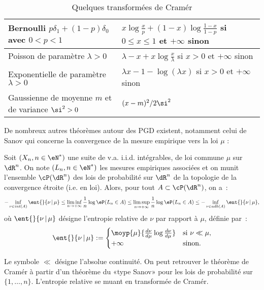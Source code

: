 \begin{table}[htbp]
  \begin{center}\small
    \begin{tabular}[c]{|l|l|}\hline
      Bernoulli $p\delta_1 + (1-p)\delta_0$ avec $0<p<1$&
      $x\log\frac{x}{p} + (1-x)\log\frac{1-x}{1-p}$ si
      $0\leq x\leq 1$ et $+\infty$ sinon \\ \hline
      Poisson de paramètre $\lambda>0$ &
      $\lambda-x+x\log\frac{x}{\lambda}$ si $x>0$ et $+\infty$ sinon \\ \hline
      Exponentielle de paramètre $\lambda>0$ &
      $\lambda x -1 -\log(\lambda x)$ si $x>0$ et $+\infty$ sinon\\ \hline
      Gaussienne de moyenne $m$ et de variance $\si^2>0$ &
      $(x-m)^2/{2\si^2}$ \\ \hline
    \end{tabular}
    \caption{Quelques transformées de Cramér}
    \label{tab:exple-transfo-cramer}
  \end{center}
\end{table}
De nombreux autres théorèmes autour des PGD existent, notamment celui de Sanov
qui concerne la convergence de la mesure empirique vers la loi $\mu$ :
\begin{theorem}
  Soit $(X_n,n\in\eN^*)$ une suite de v.a. i.i.d. intégrables, de loi commune
  $\mu$ sur $\dR^n$. On note $(L_n,n\in\eN^*)$ les mesures empiriques associées et
  on munit l'ensemble $\cP(\dR^n)$ des lois de probabilité sur $\dR^n$ de la
  topologie de la convergence étroite (i.e. en loi).  Alors, pour tout
  $A\subset\cP(\dR^n)$, on a~:
$$
-\inf_{\nu\in int(A)} \ent{}{\nu\,\vert\,\mu}
\leq
\liminf_{n\to+\infty} \frac{1}{n}\log\eP(L_n\in A)
\leq 
\limsup_{n\to+\infty} \frac{1}{n}\log\eP(L_n\in A)
\leq
-\inf_{\nu\in adh(A)} \ent{}{\nu\,\vert\,\mu},
$$
où $\ent{}{\nu\,\vert\,\mu}$ désigne l'entropie relative de $\nu$ par rapport
à $\mu$, définie par~:
$$
\ent{}{\nu\,\vert\,\mu}:=
\begin{cases}
\moyp{\mu}{\frac{d\nu}{d\mu}\log \frac{d\nu}{d\mu}} & \text{si } \nu \ll \mu,\\
+\infty & \text{sinon}.
\end{cases}
$$
\end{theorem}
Le symbole $\ll$ désigne l'absolue continuité. On peut retrouver le théorème
de Cramér à partir d'un théorème du «type Sanov» pour les lois de probabilité
sur $\{1,\ldots,n\}$. L'entropie relative se muant en transformée de Cramér.

